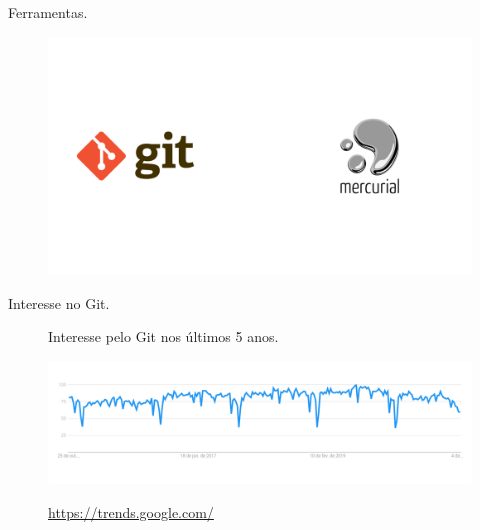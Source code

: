 \documentclass[brazil,aspectratio=169]{beamer}
\begin{document}
\begin{frame}{Ferramentas.}

  \begin{figure}
    \centering
    \includegraphics[scale=0.35]{imagens/ferramentas}
  \end{figure}
  
\end{frame}

\begin{frame}{Interesse no Git.}

  \begin{figure}
    \centering
    Interesse pelo Git nos últimos 5 anos.   
    
    \includegraphics[scale=1]{imagens/git-trends-google}	   
    
    \url{https://trends.google.com/}
  \end{figure}

\end{frame}
\end{document}
